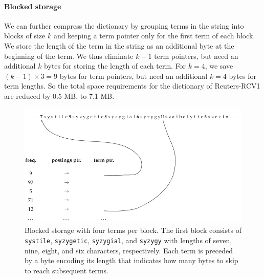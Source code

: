 \documentclass[letterpaper,11pt]{article}
\newcommand{\code}[1]{\texttt{#1}}
\begin{document}
\paragraph{Blocked storage}
We can further compress the dictionary by grouping terms in the string into blocks of size $k$ and keeping a term pointer only for the first term of each block. We store the length of the term in the string as an additional byte at the beginning of the term. We thus eliminate $k − 1$ term pointers, but need an additional $k$ bytes for storing the length of each term. For $k = 4$, we save $(k − 1) \times 3 = 9$ bytes for term pointers, but need an additional $k = 4$ bytes for term lengths. So the total space requirements for the dictionary of Reuters-RCV1 are reduced by 0.5 MB, to 7.1 MB.
\begin{figure}[H]
    \centering
    \includegraphics[scale=0.55]{sect5/figure_5_5.png}
    \caption{Blocked storage with four terms per block. The first block consists of \code{systile}, \code{syzygetic}, \code{syzygial}, and \code{syzygy} with lengths of seven, nine, eight, and six characters, respectively. Each term is preceded by a byte encoding its length that indicates how many bytes to skip to reach subsequent terms.}
\end{figure}
\end{document}
